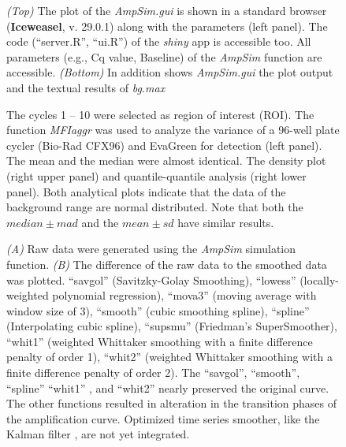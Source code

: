 \documentclass[twocolumn]{bmcart}%
\begin{document}
\begin{backmatter}
\begin{figure}[h]
  \caption{\label{figure:browser}
   \emph{(Top)} 
The plot of the \textsl{AmpSim.gui} is shown in a standard browser 
(\textbf{Iceweasel}, v. 29.0.1) along with the parameters (left panel). The code 
(``server.R'', ``ui.R'') of the \emph{shiny} app is accessible too. All 
parameters (e.g., Cq value, Baseline) of the \textsl{AmpSim} function are 
accessible. \emph{(Bottom)} In addition shows \textsl{AmpSim.gui} the plot 
output and the textual results of \textsl{bg.max}}
      \end{figure}
      
\begin{figure}[h]
  \caption{\label{figure:MFIaggr}
   The cycles 1 -- 10 were selected as region of interest (ROI). The function 
\textsl{MFIaggr} was used to analyze the variance of a 96-well plate cycler 
(Bio-Rad CFX96) and EvaGreen for detection (left panel). The mean and the median 
were almost identical. The density plot (right upper panel) and 
quantile-quantile analysis (right lower panel). Both analytical plots indicate 
that the data of the background range are normal distributed. Note that both the 
$median \pm mad$ and the $mean \pm sd$ have similar results. }
      \end{figure}       

\begin{figure}[h]
  \caption{\label{figure:smoother}
\emph{(A)} Raw data were generated using the \textsl{AmpSim} simulation 
function. \emph{(B)} The difference of the raw data to the smoothed data was 
plotted. ``savgol'' (Savitzky-Golay Smoothing), ``lowess'' (locally-weighted 
polynomial regression), ``mova3'' (moving average with window size of 3), 
``smooth'' (cubic smoothing spline), ``spline'' (Interpolating cubic spline), 
``supsmu'' (Friedman's SuperSmoother), ``whit1'' (weighted Whittaker smoothing 
with a finite difference penalty of order 1), ``whit2'' (weighted Whittaker 
smoothing with a finite difference penalty of order 2). The ``savgol'', 
``smooth'', ``spline'' ``whit1'' , and ``whit2'' nearly preserved the original 
curve. The other functions resulted in alteration in the transition phases of 
the amplification curve. Optimized time series smoother, like the Kalman 
filter \cite{Tusell_2010}, are not yet integrated. }
      \end{figure}       
     

\end{backmatter}
\end{document}
